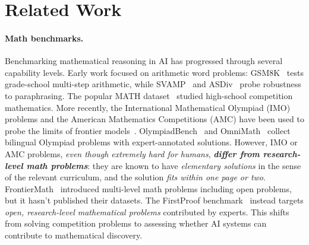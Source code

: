 \documentclass{article}
\begin{document}
\vspace{-10pt}
\section{Related Work}
\label{sec:related}
\vspace{-7pt}
\paragraph{Math benchmarks.}
Benchmarking mathematical reasoning in AI has progressed through several capability levels.
Early work focused on arithmetic word problems: GSM8K~\citep{cobbe2021gsm8k} tests grade-school multi-step arithmetic, while SVAMP~\citep{patel2021svamp} and ASDiv~\citep{miao2020asdiv} probe robustness to paraphrasing. The popular MATH dataset~\citep{hendrycks2021math} studied high-school competition mathematics. More recently, the International Mathematical Olympiad (IMO) problems and the American Mathematics Competitions (AMC) have been used to probe the limits of frontier models~\citep{trinh2024alphageometry,openai2024openaio1}. OlympiadBench~\citep{he2024olympiadbench} and OmniMath~\citep{gao2024omnimath} collect bilingual Olympiad problems with expert-annotated solutions. However, IMO or AMC problems, \textit{even though extremely hard for humans}, \emph{\textbf{differ from research-level math problems}}: they are known to have \textit{elementary solutions} in the sense of the relevant curriculum, and the solution \textit{fits within one page or two}. FrontierMath~\citep{glazer2024frontiermath} introduced multi-level math problems including open problems, but it hasn't published their datasets. The FirstProof benchmark~\citep{abouzaid2026first} instead targets \emph{open, research-level mathematical problems} contributed by experts. This shifts from solving competition problems to assessing whether AI systems can contribute to mathematical discovery.
\vspace{-7pt}
\end{document}

